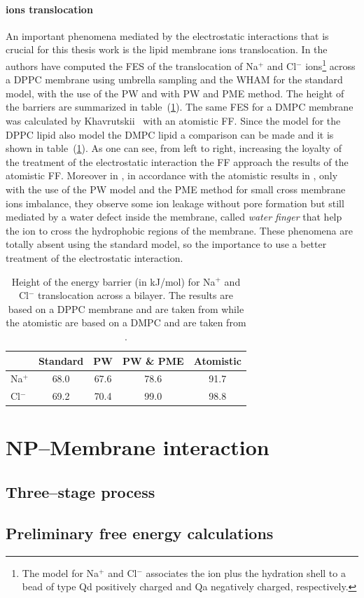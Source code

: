 \paragraph{\textbf{ions translocation}} An important phenomena mediated by the electrostatic interactions that is crucial for this thesis work is the lipid membrane ions translocation. In \cite{PW} the authors have computed the \ac{FES} of the translocation of Na$^+$ and Cl$^-$ ions\footnote{The \martini model for Na$^+$ and Cl$^-$ associates the ion plus the hydration shell to a bead of type Qd positively charged and Qa negatively charged, respectively.} across a \acs{DPPC} membrane using umbrella sampling and the \ac{WHAM} for the standard \martini model, with the use of the \ac{PW} and with \ac{PW} and \ac{PME} method. The height of the barriers are summarized in table~(\ref{tab:ionTranslocation}). The same \ac{FES} for a \acs{DMPC} membrane was calculated by Khavrutskii \etal\, \cite{atomisticTranslocation} with an atomistic \ac{FF}. Since the \martini model for the \acs{DPPC} lipid also model the \acs{DMPC} lipid a comparison can be made and it is shown in table~(\ref{tab:ionTranslocation}). As one can see, from left to right, increasing the loyalty of the treatment of the electrostatic interaction the \martini \ac{FF} approach the results of the atomistic \ac{FF}. Moreover in \cite{PW}, in accordance with the atomistic results in \cite{atomisticTranslocation}, only with the use of the \ac{PW} model and the \ac{PME} method for small cross membrane ions imbalance, they observe some ion leakage without pore formation but still mediated by a water defect inside the membrane, called \textit{water finger} that help the ion to cross the hydrophobic regions of the membrane. These phenomena are totally absent using the standard \martini model, so the importance to use a better treatment of the electrostatic interaction.
\begin{table}
	\centering
	\begin{tabular}{lcccc}
		\toprule
		\,		& Standard & \acs{PW} & \acs{PW} \& \acs{PME} & Atomistic	\\ \toprule
		Na$^+$	& 68.0	   & 67.6	  & 78.6					& 91.7 		\\ \midrule
		Cl$^-$	& 69.2	   & 70.4	  & 99.0					& 98.8		\\ \bottomrule
	\end{tabular}
	\caption{Height of the energy barrier (in kJ/mol) for Na$^+$ and Cl$^-$ translocation across a bilayer. The \martini results are based on a \acs{DPPC} membrane and are taken from \cite{PW} while the atomistic are based on a \acs{DMPC} and are taken from \cite{atomisticTranslocation}.}
	\label{tab:ionTranslocation}
\end{table}

\section{NP--Membrane interaction}

\subsection{Three--stage process}

\subsection{Preliminary free energy calculations}






